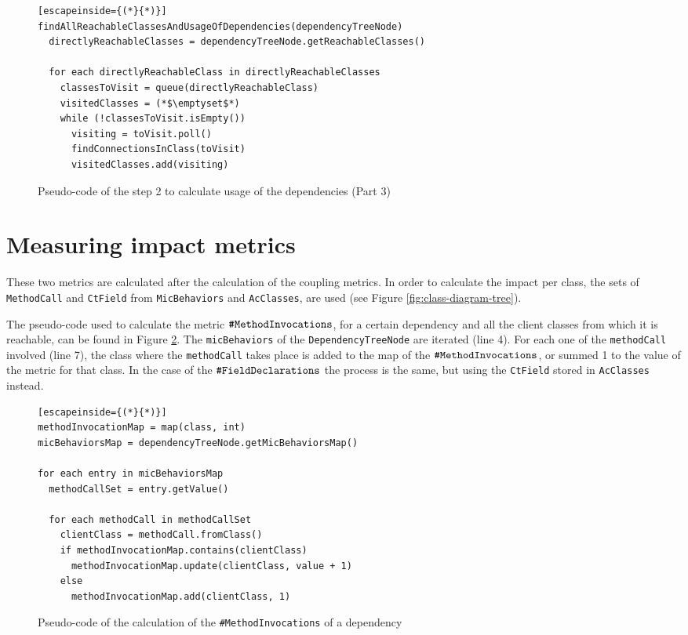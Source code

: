 \begin{figure}[ht!]
\begin{lstlisting}[escapeinside={(*}{*)}]
findAllReachableClassesAndUsageOfDependencies(dependencyTreeNode)
  directlyReachableClasses = dependencyTreeNode.getReachableClasses()

  for each directlyReachableClass in directlyReachableClasses
    classesToVisit = queue(directlyReachableClass)
    visitedClasses = (*$\emptyset$*)
    while (!classesToVisit.isEmpty())
      visiting = toVisit.poll()
      findConnectionsInClass(toVisit)
      visitedClasses.add(visiting)
\end{lstlisting}
\caption{Pseudo-code of the step 2 to calculate usage of the dependencies (Part 3)}
\label{fig:algorithm-usage-step2-3}
\end{figure}

\section{Measuring impact metrics}
These two metrics are calculated after the calculation of the coupling metrics. In order to calculate the impact per class, the sets of \texttt{MethodCall} and \texttt{CtField} from \texttt{MicBehaviors} and \texttt{AcClasses}, are used (see Figure \ref{fig:class-diagram-tree}).

The pseudo-code used to calculate the metric $\verb|#MethodInvocations|$, for a certain dependency and all the client classes from which it is reachable, can be found in Figure \ref{fig:algorithm-method-invocations}. The \texttt{micBehaviors} of the \texttt{DependencyTreeNode} are iterated (line 4). For each one of the \texttt{methodCall} involved (line 7), the class where the \texttt{methodCall} takes place is added to the map of the $\verb|#MethodInvocations|$, or summed 1 to the value of the metric for that class. In the case of the $\verb|#FieldDeclarations|$ the process is the same, but using the \texttt{CtField} stored in \texttt{AcClasses} instead.

\begin{figure}[ht!]
\begin{lstlisting}[escapeinside={(*}{*)}]
methodInvocationMap = map(class, int)
micBehaviorsMap = dependencyTreeNode.getMicBehaviorsMap()

for each entry in micBehaviorsMap
  methodCallSet = entry.getValue()

  for each methodCall in methodCallSet
    clientClass = methodCall.fromClass()
    if methodInvocationMap.contains(clientClass)
      methodInvocationMap.update(clientClass, value + 1)
    else
      methodInvocationMap.add(clientClass, 1)
\end{lstlisting}
\caption{Pseudo-code of the calculation of the \texttt{\#MethodInvocations} of a dependency}
\label{fig:algorithm-method-invocations}
\end{figure}

